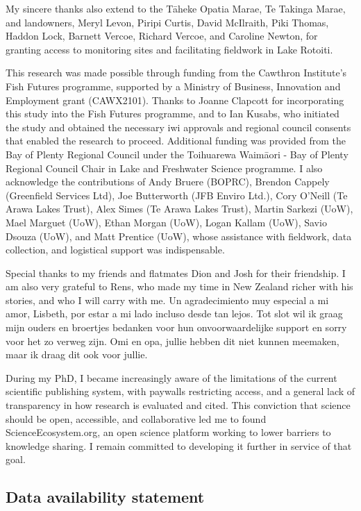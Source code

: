 \documentclass[
  12pt,
  a4paper,
  oneside]{scrbook}
\begin{document}
My sincere thanks also extend to the Tāheke Opatia Marae, Te Takinga
Marae, and landowners, Meryl Levon, Piripi Curtis, David McIlraith, Piki
Thomas, Haddon Lock, Barnett Vercoe, Richard Vercoe, and Caroline
Newton, for granting access to monitoring sites and facilitating
fieldwork in Lake Rotoiti.

This research was made possible through funding from the Cawthron
Institute's Fish Futures programme, supported by a Ministry of Business,
Innovation and Employment grant (CAWX2101). Thanks to Joanne Clapcott
for incorporating this study into the Fish Futures programme, and to Ian
Kusabs, who initiated the study and obtained the necessary iwi approvals
and regional council consents that enabled the research to proceed.
Additional funding was provided from the Bay of Plenty Regional Council
under the Toihuarewa Waimāori - Bay of Plenty Regional Council Chair in
Lake and Freshwater Science programme. I also acknowledge the
contributions of Andy Bruere (BOPRC), Brendon Cappely (Greenfield
Services Ltd), Joe Butterworth (JFB Enviro Ltd.), Cory O'Neill (Te Arawa
Lakes Trust), Alex Simes (Te Arawa Lakes Trust), Martin Sarkezi (UoW),
Mael Marguet (UoW), Ethan Morgan (UoW), Logan Kallam (UoW), Savio Dsouza
(UoW), and Matt Prentice (UoW), whose assistance with fieldwork, data
collection, and logistical support was indispensable.

Special thanks to my friends and flatmates Dion and Josh for their
friendship. I am also very grateful to Rens, who made my time in New
Zealand richer with his stories, and who I will carry with me. Un
agradecimiento muy especial a mi amor, Lisbeth, por estar a mi lado
incluso desde tan lejos. Tot slot wil ik graag mijn ouders en broertjes
bedanken voor hun onvoorwaardelijke support en sorry voor het zo verweg
zijn. Omi en opa, jullie hebben dit niet kunnen meemaken, maar ik draag
dit ook voor jullie.

During my PhD, I became increasingly aware of the limitations of the
current scientific publishing system, with paywalls restricting access,
and a general lack of transparency in how research is evaluated and
cited. This conviction that science should be open, accessible, and
collaborative led me to found ScienceEcosystem.org, an open science
platform working to lower barriers to knowledge sharing. I remain
committed to developing it further in service of that goal.

\subsection*{Data availability
statement}\label{data-availability-statement}
\end{document}
